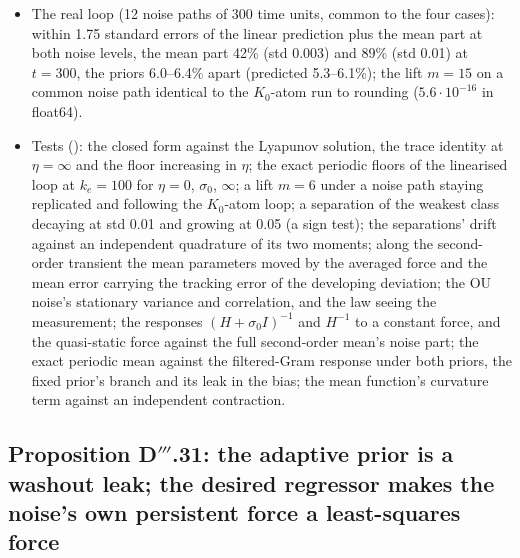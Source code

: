 \begin{itemize}
    300 time units per std) the separations' rates are $-2.50\cdot10^{-4}$, $+2.74\cdot10^{-6}$ and
    $+4.53\cdot10^{-4}$ per time unit at std 0.01, 0.03, 0.05;
    $\lambda_{\mathrm{eff}}=(\mathrm{rate}+\sigma_0/k_e)/\E\nu^2$ is $0.3271\pm0.0038$, $0.3175\pm0.0037$,
    $0.2943\pm0.0034$ against the lift's 0.2981 and the transient's 0.3264, 0.3270, 0.3281; the fit's small-noise
    limit $0.3291\pm0.0033$, the next order $-13.8\pm2.0$; the rate vanishes at std 0.0299 over the window (0.0308 by
    the lift's drift, 0.0294 by the transient's); the long-time threshold is open.
  \item The real loop (12 noise paths of 300 time units, common to the four cases): within 1.75 standard errors of the
    linear prediction plus the mean part at both noise levels, the mean part 42\% (std 0.003) and 89\% (std 0.01) at
    $t=300$, the priors 6.0--6.4\% apart (predicted 5.3--6.1\%); the lift $m=15$ on a common noise path identical to
    the $K_0$-atom run to rounding ($5.6\cdot10^{-16}$ in float64).
  \item Tests (): the closed form against the Lyapunov solution, the trace
    identity at $\eta=\infty$ and the floor increasing in $\eta$; the exact periodic floors of the linearised loop at
    $k_e=100$ for $\eta=0$, $\sigma_0$, $\infty$; a lift $m=6$ under a noise path staying replicated and following the
    $K_0$-atom loop; a separation of the weakest class decaying at std 0.01 and growing at 0.05 (a sign test); the
    separations' drift against an independent quadrature of its two moments; along the second-order transient the
    mean parameters moved by the averaged force and the mean error carrying the tracking error of the developing
    deviation; the OU noise's stationary variance and correlation, and the law seeing the measurement; the responses
    $(H+\sigma_0I)^{-1}$ and $H^{-1}$ to a constant force, and the quasi-static force against the full second-order
    mean's noise part; the exact periodic mean against the filtered-Gram response under both priors, the fixed prior's
    branch and its leak in the bias; the mean function's curvature term against an independent contraction.
\end{itemize}

\subsection{Proposition D\texorpdfstring{$'''$}{'''}.31: the adaptive prior is a washout leak; the desired regressor
makes the noise's own persistent force a least-squares force}

